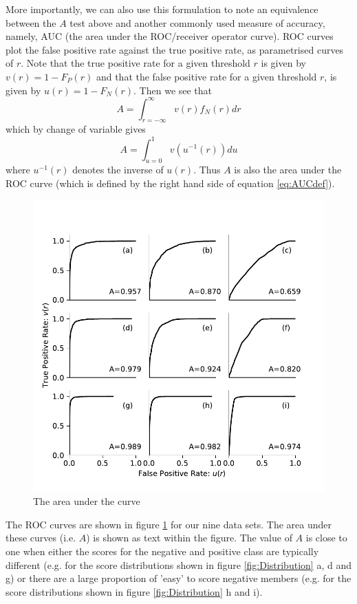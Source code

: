 \documentclass[preprint,12pt]{article}
\begin{document}
More importantly, we can also use this formulation to note an equivalence between the $A$ test above and another commonly used measure of accuracy, namely, AUC (the area under the ROC/receiver operator curve). ROC curves plot the false positive rate against the true positive rate, as parametrised curves of $r$. Note that the true positive rate for a given threshold $r$ is given by $v(r)=1-F_P(r)$ and that the false positive rate for a given threshold $r$, is given by $u(r)=1-F_N(r)$. Then we see that
\[
A  =  \int_{r=-\infty}^{\infty} v(r) f_N(r) dr  
\]
which by change of variable gives
\begin{equation}
A  = \int_{u=0}^{1} v \left( u^{-1}(r) \right) du  \label{eq:AUCdef}
\end{equation}
where $u^{-1}(r)$ denotes the inverse of $u(r)$. Thus $A$ is also the area under the ROC curve (which is defined by the right hand side of equation \ref{eq:AUCdef}).

\begin{figure}[t]
\centering
\includegraphics[scale=1]{Figures/AUC.pdf}
\caption{The area under the curve} \label{fig:AUC}
\end{figure}

The ROC curves are shown in figure \ref{fig:AUC} for our nine data sets. The area under these curves (i.e. $A$) is shown as text within the figure. The value of $A$ is close to one when either the scores for the negative and positive class are typically different (e.g. for the score distributions shown in figure \ref{fig:Distribution} a, d and g) or there are a large proportion of 'easy' to score negative members (e.g. for the score distributions shown in figure \ref{fig:Distribution} h and i). 
\end{document}
